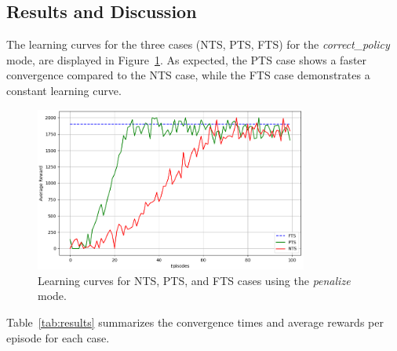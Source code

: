 \documentclass[runningheads]{llncs}
\theoremstyle{freethm}
\theoremstyle{proofoutline}
\begin{document}
\subsection{Results and Discussion}

The learning curves for the three cases (NTS, PTS, FTS) for the \textit{correct\_policy} mode, are displayed in Figure~\ref{fig:learning_curves}. As expected, the PTS case shows a faster convergence compared to the NTS case, while the FTS case demonstrates a constant learning curve.

\begin{figure}[h!]
    \centering
    \includegraphics[width=0.8\textwidth]{figures/penalize_learning_curves.png}
    \caption{Learning curves for NTS, PTS, and FTS cases using the \textit{penalize} mode.}
    \label{fig:learning_curves}
\end{figure}

Table~\ref{tab:results} summarizes the convergence times and average rewards per episode for each case.
\end{document}
